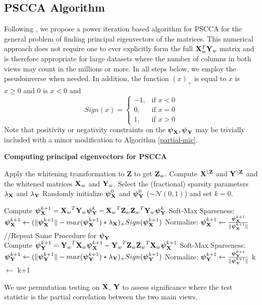 \documentclass{llncs}
\newcommand{\X}{{\bf X}}
\newcommand{\Y}{{\bf Y}}
\newcommand{\Z}{{\bf Z}}
\newcommand{\bs}{\boldsymbol}
\begin{document}
\subsection{PSCCA Algorithm}
Following \cite{golub}, we propose a power iteration based algorithm
for PSCCA for the general problem of finding principal eigenvectors of
the matrices.  This numerical approach does not require one to ever
explicitly form the full $\X_{w}^T \Y_{w}$ matrix and is therefore
appropriate for large datasets where the number of columns in both views may
count in the millions or more.  In all steps below, we employ the
pseudoinverse when needed.  In addition, the function $(x)_+$ is equal to $x$ is $x \geq 0$ and $0$ is $x <0$ and 
 \begin{equation}
Sign(x)= \begin{cases} -1, & \mbox{if } x<0 \\0, & \mbox{if } x=0 \\1, & \mbox{if } x>0 \end{cases}
\end{equation}
Note that positivity or negativity constraints on the
$\bs\psi_{\X}, \bs\psi_{\Y}$ may be trivially included with a minor
modification to Algorithm \ref{partial-mic}.
\begin{algorithm}[htdp]
\small \caption{\bf Computing principal eigenvectors for PSCCA}
\label{partial-mic}
\begin{algorithmic}[1]
\STATE Apply the whitening transformation to {\Z} to get $\Z_{w}$.
\STATE Compute $\X^{\backslash \Z}$ and $\Y^{\backslash \Z}$ and the whitened matrices $\X_{w}$ and $\Y_{w}$. 
\STATE Select the (fractional) sparsity parameters $\lambda_{\X}$ and $\lambda_{\Y}$
\STATE Randomly initialize $\bs \psi_{\X}^0$ and $\bs \psi_{\Y}^0$ ($\sim \mathcal{N}(0,1)$) and set $k=0$.

\WHILE {$\Delta$ Corr($\bs X_w \bs \psi_{\X}^{k+1}$, $\bs Y_w \bs \psi_{\Y}^{k+1}$) $<$ $\epsilon$}
\STATE Compute  $\bs \psi_{\X}^{k+1}= {\X_w}^T {\Y_w} \bs \psi_{\Y}^{k} -  {\X_w}^T  {\Z_w} {\Z_w}^T {\Y_w} \bs \psi_{\Y}^{k}$
\STATE Soft-Max Sparseness:  $\bs \psi_{\X}^{k+1} \leftarrow (\|\bs \psi_{\X}^{k+1}\|  - max(\bs \psi_{\X}^{k+1})*\lambda_{\X})_+ Sign(\bs \psi_{\X}^{k+1})$
\STATE Normalize: $\bs \psi_{\X}^{k+1} \leftarrow \frac{\bs \psi_{\X}^{k+1}}{\|\bs \psi_{\X}^{k+1}\|}$\\
//Repeat Same Procedure for $\bs \psi_{\Y}$ \\
\STATE Compute  $\bs \psi_{\Y}^{k+1}= {\Y_w}^T {\X_w} \bs \psi_{\X}^{k+1} -  {\Y_w}^T  {\Z_w} {\Z_w}^T {\X_w} \bs \psi_{\X}^{k+1}$
\STATE Soft-Max Sparseness: $\bs \psi_{\Y}^{k+1} \leftarrow (\|\bs \psi_{\Y}^{k+1}\|  - max(\bs \psi_{\Y}^{k+1})*\lambda_{\Y})_+ Sign(\bs \psi_{\Y}^{k+1})$
\STATE Normalize: $\bs \psi_{\Y}^{k+1} \leftarrow \frac{\bs \psi_{\Y}^{k+1}}{\|\bs \psi_{\Y}^{k+1}\|}$
\STATE k $\leftarrow$ k+1
\ENDWHILE
\end{algorithmic}
\end{algorithm}
We use permutation testing on $\X$, $\Y$ to assess significance where
the test statistic is the partial correlation between the two main views.
\end{document}
